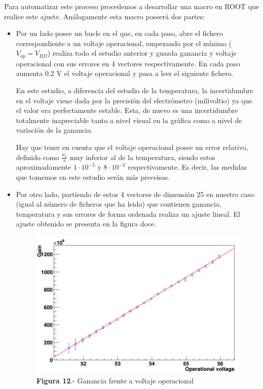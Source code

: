 Para automatizar este proceso procedemos a desarrollar una macro en ROOT que realice este ajuste. Análogamente esta macro poseerá dos partes:
\begin{itemize}
\item{} Por un lado posee un bucle en el que, en cada paso, abre el fichero correspondiente a un voltaje operacional, empezando por el mínimo ($V_{op}=V_{BD}$) realiza todo el estudio anterior y guarda ganancia y voltaje operacional con sus errores en 4 vectores respectivamente. En cada paso aumenta 0.2 V el voltaje operacional y pasa a leer el siguiente fichero. 

En este estudio, a diferencia del estudio de la temperatura, la incertidumbre en el voltaje viene dada por la precisión del electrómetro (milivoltio) ya que el valor era perfectamente estable. Esta, de nuevo es una incertidumbre totalmente inapreciable tanto a nivel visual en la gráfica como a nivel de variación de la ganancia. 

Hay que tener en cuenta que el voltaje operacional posee un error relativo, definido como $\frac{\sigma_x}{x}$ muy inferior al de la temperatura, siendo estos aproximadamente $1 \cdot 10^{-5}$ y $8 \cdot 10^{-3}$ respectivamente. Es decir, las medidas que tomemos en este estudio serán más preceisas.

\item {} Por otro lado, partiendo de estos 4 vectores de dimensión 25 en nuestro caso (igual al número de ficheros que ha leido) que contienen ganancia, temperatura y sus errores de forma ordenada realiza un ajuste lineal. El ajuste obtenido se presenta en la figura doce.

\begin{figure}[hbtp]
\centering
\includegraphics[scale=0.4]{Dependenciavoltaje.png}
\caption{\textbf{Figura 12}.- Ganancia frente a voltaje operacional}
\end{figure}


\end{itemize}
